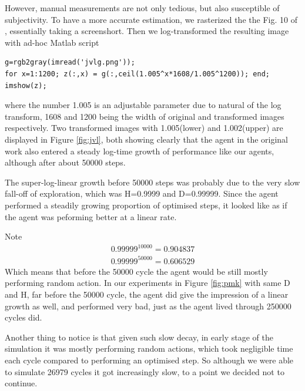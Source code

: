 \documentclass{article}
\begin{document}
\begin{flushleft}
However, manual measurements are not only tedious, but also
susceptible of subjectivity.
To have a more accurate estimation,
we rasterized the the Fig. 10 of \cite{orig},
essentially taking a screenshort.
Then we log-transformed the resulting image
with ad-hoc Matlab script
\begin{verbatim}
g=rgb2gray(imread('jvlg.png'));
for x=1:1200; z(:,x) = g(:,ceil(1.005^x*1608/1.005^1200)); end; imshow(z);
\end{verbatim}
where the number 1.005 is an adjustable parameter due
to natural of the log transform, 
1608 and 1200 being the width of original and transformed
images respectively.
Two transformed images with 1.005(lower) and 1.002(upper)
are displayed in Figure \ref{fig:jvl},
both showing clearly that the agent
in the original work also entered
a steady log-time growth of performance like our agents,
although after about 50000 steps.

The super-log-linear growth before 50000 steps was
probably due to the very slow fall-off of exploration,
which was H=0.9999 and D=0.99999.
Since the agent performed a steadily growing proportion
of optimised steps, it looked like as if the 
agent was peforming better at a linear rate.


Note
\begin{align*}
0.99999^{10000}=0.904837\\
0.99999^{50000}=0.606529
\end{align*}
Which means that before the 50000 cycle the
agent would be still mostly performing random action.
In our experiments in Figure \ref{fig:pmk} with same D and H, 
far before the 50000 cycle, the agent
did give the impression of a linear growth as well,
and performed very bad, just as the agent lived through
250000 cycles did. 

Another thing to notice is that given such slow decay,
in early stage of the simulation it was mostly performing 
random actions, which took negligible time each cycle compared to
performing an optimised step.
So although we were able to simulate 26979 cycles it got
increasingly slow, to a point we decided not to continue.



\end{flushleft}
\end{document}
